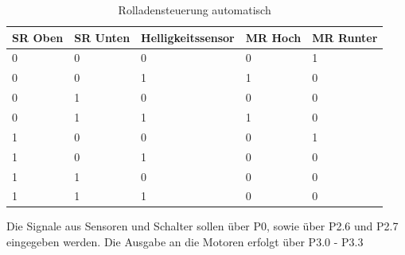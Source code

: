 \begin{table}[]
\centering
\caption{Rolladensteuerung automatisch}
\label{my-label}
\begin{tabular}{|l|l|l|l|l|}
\hline
\multicolumn{1}{|c|}{\textbf{SR Oben}} & \multicolumn{1}{c|}{\textbf{SR Unten}} & \multicolumn{1}{c|}{\textbf{Helligkeitssensor}} & \multicolumn{1}{c|}{\textbf{MR Hoch}} & \multicolumn{1}{c|}{\textbf{MR Runter}} \\ \hline
0 & 0 & 0 & 0 & 1 \\ \hline
0 & 0 & 1 & 1 & 0 \\ \hline
0 & 1 & 0 & 0 & 0 \\ \hline
0 & 1 & 1 & 1 & 0 \\ \hline
1 & 0 & 0 & 0 & 1 \\ \hline
1 & 0 & 1 & 0 & 0 \\ \hline
1 & 1 & 0 & 0 & 0 \\ \hline
1 & 1 & 1 & 0 & 0 \\ \hline
\end{tabular}
\end{table}
Die Signale aus Sensoren und Schalter sollen über P0, sowie über P2.6 und P2.7 eingegeben werden. Die Ausgabe an die Motoren erfolgt über P3.0 - P3.3
